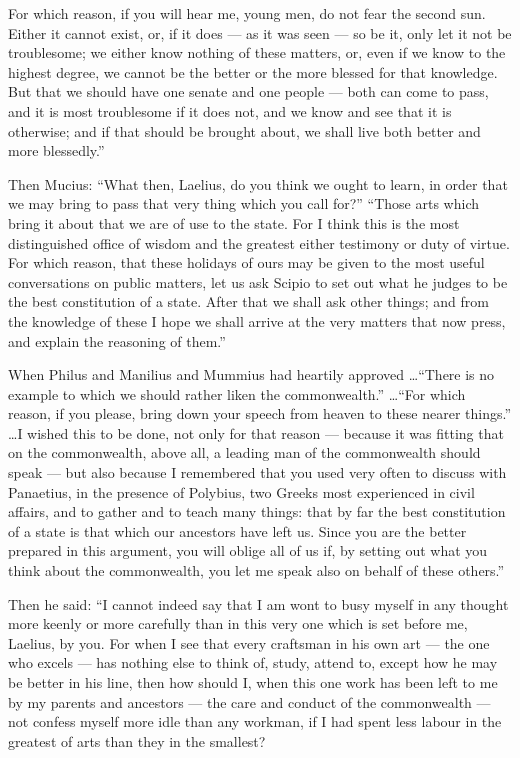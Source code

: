  For which reason, if you will hear me, young men, do not fear the second sun. Either it cannot exist, or, if it does --- as it was seen --- so be it, only let it not be troublesome; we either know nothing of these matters, or, even if we know to the highest degree, we cannot be the better or the more blessed for that knowledge. But that we should have one senate and one people --- both can come to pass, and it is most troublesome if it does not, and we know and see that it is otherwise; and if that should be brought about, we shall live both better and more blessedly.''

 Then Mucius: ``What then, Laelius, do you think we ought to learn, in order that we may bring to pass that very thing which you call for?'' ``Those arts which bring it about that we are of use to the state. For I think this is the most distinguished office of wisdom and the greatest either testimony or duty of virtue. For which reason, that these holidays of ours may be given to the most useful conversations on public matters, let us ask Scipio to set out what he judges to be the best constitution of a state. After that we shall ask other things; and from the knowledge of these I hope we shall arrive at the very matters that now press, and explain the reasoning of them.''

 When Philus and Manilius and Mummius had heartily approved \ldots ``There is no example to which we should rather liken the commonwealth.'' \ldots ``For which reason, if you please, bring down your speech from heaven to these nearer things.'' \ldots I wished this to be done, not only for that reason --- because it was fitting that on the commonwealth, above all, a leading man of the commonwealth should speak --- but also because I remembered that you used very often to discuss with Panaetius, in the presence of Polybius, two Greeks most experienced in civil affairs, and to gather and to teach many things: that by far the best constitution of a state is that which our ancestors have left us. Since you are the better prepared in this argument, you will oblige all of us if, by setting out what you think about the commonwealth, you let me speak also on behalf of these others.''

 Then he said: ``I cannot indeed say that I am wont to busy myself in any thought more keenly or more carefully than in this very one which is set before me, Laelius, by you. For when I see that every craftsman in his own art --- the one who excels --- has nothing else to think of, study, attend to, except how he may be better in his line, then how should I, when this one work has been left to me by my parents and ancestors --- the care and conduct of the commonwealth --- not confess myself more idle than any workman, if I had spent less labour in the greatest of arts than they in the smallest?

